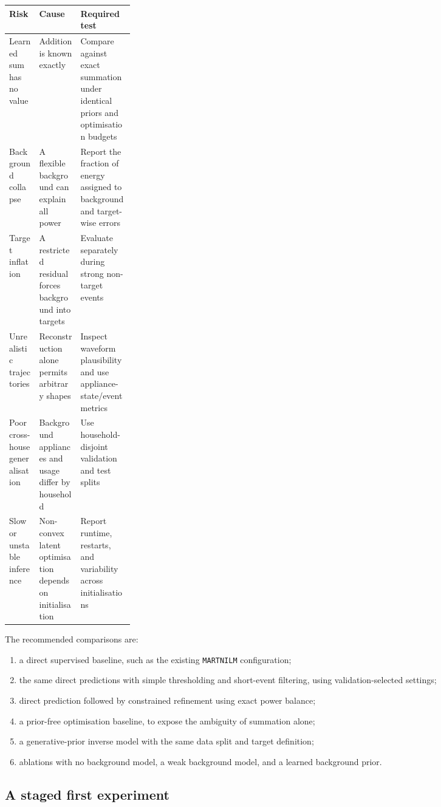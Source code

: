 \documentclass[11pt]{article}
\begin{document}
\begin{center}
\begin{tabularx}{\linewidth}{@{}p{0.24\linewidth}YY@{}}
\toprule
Risk & Cause & Required test \\
\midrule
Learned sum has no value & Addition is known exactly & Compare against exact summation under identical priors and optimisation budgets \\
Background collapse & A flexible background can explain all power & Report the fraction of energy assigned to background and target-wise errors \\
Target inflation & A restricted residual forces background into targets & Evaluate separately during strong non-target events \\
Unrealistic trajectories & Reconstruction alone permits arbitrary shapes & Inspect waveform plausibility and use appliance-state/event metrics \\
Poor cross-house generalisation & Background appliances and usage differ by household & Use household-disjoint validation and test splits \\
Slow or unstable inference & Non-convex latent optimisation depends on initialisation & Report runtime, restarts, and variability across initialisations \\
\bottomrule
\end{tabularx}
\end{center}

The recommended comparisons are:
\begin{enumerate}
    \item a direct supervised baseline, such as the existing \texttt{MARTNILM} configuration;
    \item the same direct predictions with simple thresholding and short-event filtering, using validation-selected settings;
    \item direct prediction followed by constrained refinement using exact power balance;
    \item a prior-free optimisation baseline, to expose the ambiguity of summation alone;
    \item a generative-prior inverse model with the same data split and target definition;
    \item ablations with no background model, a weak background model, and a learned background prior.
\end{enumerate}

\subsection{A staged first experiment}
\end{document}
